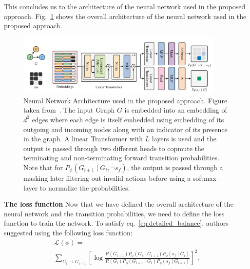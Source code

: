 \documentclass{lxaiproposal}
\begin{document}
    This concludes us to the architecture of the neural network used in the proposed approach. Fig.~\ref{fig:nn_architecture}
    shows the overall architecture of the neural network used in the proposed approach.

    \begin{figure}
        \centering
        \includegraphics[width=0.92\textwidth]{figures/nn_architecture}
        \caption{Neural Network Architecture used in the proposed approach. Figure taken from~\cite{deleu2022daggflownet}.
        The input Graph $G$ is embedded into an embedding of $d^2$ edges where each edge is itself embedded using
        embedding of its outgoing and incoming nodes along with an indicator of its presence in the graph. A linear Transformer
        with $L$ layers is used and the output is passed through two different heads to copmute the terminating and non-terminating
        forward transition probabilities. Note that for $P_{\phi}(G_{i+1} \mid G_i, \neg s_f)$, the output is passed through a
        masking later filtering out invalid actions before using a softmax layer to normalize the probabilities.}
        \label{fig:nn_architecture}
    \end{figure}

    \vspace*{3mm}

    \textbf{The loss function} Now that we have defined the overall architecture of the neural network and the
    transition probabilities, we need to define the loss function to train the network.
    To satisfy eq.~\eqref{eq:detailed_balance}, authors suggested using the following loss function:
    \begin{equation}
        \begin{array}{l}
            \mathcal{L}(\phi) = \\
            \sum_{G_i \to G_{i+1}} \left[ \log
            \frac{R(G_{i+1})P_{\psi}(G_i \mid G_{i+1})P_{\phi}(s_f \mid G_i)}{R(G_i)P_{\phi}(G_{i+1} \mid G_i)P_{\phi}(s_f \mid G_{i+1})} \right]^2 .
        \end{array}
        \label{eq:loss_function}
    \end{equation}
\end{document}
